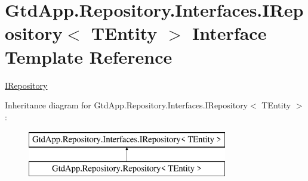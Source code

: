 \hypertarget{interface_gtd_app_1_1_repository_1_1_interfaces_1_1_i_repository}{}\section{Gtd\+App.\+Repository.\+Interfaces.\+I\+Repository$<$ T\+Entity $>$ Interface Template Reference}
\label{interface_gtd_app_1_1_repository_1_1_interfaces_1_1_i_repository}


\mbox{\hyperlink{interface_gtd_app_1_1_repository_1_1_interfaces_1_1_i_repository}{I\+Repository}}  


Inheritance diagram for Gtd\+App.\+Repository.\+Interfaces.\+I\+Repository$<$ T\+Entity $>$\+:\begin{figure}[H]
\begin{center}
\leavevmode
\includegraphics[height=2.000000cm]{interface_gtd_app_1_1_repository_1_1_interfaces_1_1_i_repository}
\end{center}
\end{figure}
